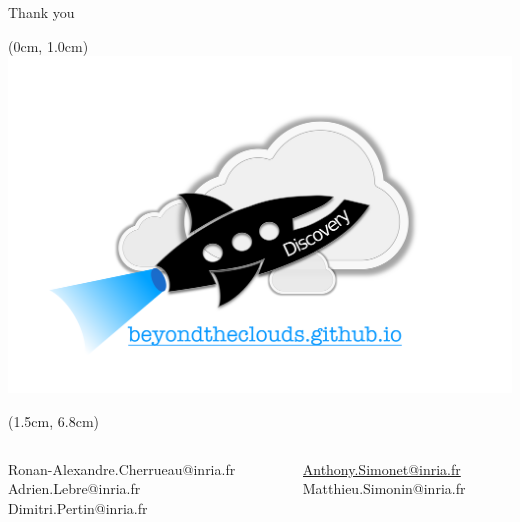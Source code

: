 \documentclass[10pt]{beamer}
\begin{document}
\begin{frame}{Thank you}
  \begin{textblock*}{\paperwidth}(0cm, 1.0cm)
   \centering\includegraphics[scale=.7]{figs/discovery-sticker.png}
  \end{textblock*}

  \begin{textblock*}{.7\paperwidth}(1.5cm, 6.8cm)
  \begin{columns}
    \begin{column}{.65\textwidth}
		Ronan-Alexandre.Cherrueau@inria.fr\\
		Adrien.Lebre@inria.fr\\
		Dimitri.Pertin@inria.fr
    \end{column}
    \begin{column}{.55\textwidth}
		\underline{Anthony.Simonet@inria.fr}\\
		Matthieu.Simonin@inria.fr
    \end{column}
  \end{columns}
  \end{textblock*}
\end{frame}
\end{document}
